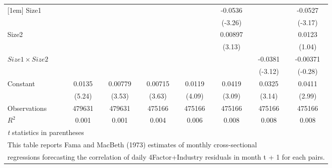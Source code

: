 {\begin{tabular}{l*{7}{c}}
[1em]
Size1               &                     &                     &                     &                     &     -0.0536\sym{**} &                     &     -0.0527\sym{**} \\
                    &                     &                     &                     &                     &     (-3.26)         &                     &     (-3.17)         \\
[1em]
Size2               &                     &                     &                     &                     &     0.00897\sym{**} &                     &      0.0123         \\
                    &                     &                     &                     &                     &      (3.13)         &                     &      (1.04)         \\
[1em]
$ Size1 \times Size2 $&                     &                     &                     &                     &                     &     -0.0381\sym{**} &    -0.00371         \\
                    &                     &                     &                     &                     &                     &     (-3.12)         &     (-0.28)         \\
[1em]
Constant            &      0.0135\sym{***}&     0.00779\sym{***}&     0.00715\sym{***}&      0.0119\sym{***}&      0.0419\sym{**} &      0.0325\sym{**} &      0.0411\sym{**} \\
                    &      (5.24)         &      (3.53)         &      (3.63)         &      (4.09)         &      (3.09)         &      (3.14)         &      (2.99)         \\
\hline
Observations        &      479631         &      479631         &      475166         &      475166         &      475166         &      475166         &      475166         \\
\(R^{2}\)           &       0.001         &       0.001         &       0.004         &       0.006         &       0.008         &       0.008         &       0.008         \\
\hline\hline
\multicolumn{8}{l}{\footnotesize \textit{t} statistics in parentheses}\\
\multicolumn{8}{l}{\footnotesize This table reports Fama and MacBeth (1973) estimates of monthly cross-sectional}\\
\multicolumn{8}{l}{\footnotesize  regressions forecasting the correlation of daily 4Factor+Industry residuals in month t + 1 for each pairs.}\\

\end{tabular}}
